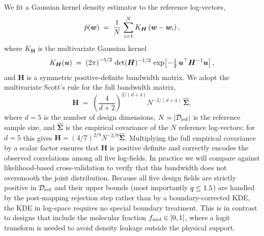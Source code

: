 We fit a Gaussian kernel density estimator to the reference log-vectors,
\begin{equation}
\hat{p}(\bm{w}) \;=\; \frac{1}{N}\,\sum_{i=1}^{N}
K_{\bm{H}}\left({\bm{w} - \bm{w}_i}\right),
\label{eq:kde}
\end{equation}
where $K_{\bm{H}}$ is the multivariate Gaussian kernel
\begin{equation}
K_{\bm{H}}(\bm{u}) \;=\;
\left({2\pi}\right)^{-5/2}\,\det(\bm{H})^{-1/2}\,
\exp\!\left[{-\tfrac{1}{2}\,\bm{u}^{\top}\bm{H}^{-1}\bm{u}}\right],
\label{eq:gaussian_kernel}
\end{equation}
and $\bm{H}$ is a symmetric positive-definite bandwidth matrix. We adopt
the multivariate Scott's rule for the full bandwidth matrix,
\begin{equation}
\bm{H} \;=\; \left(\frac{4}{d+2}\right)^{\!\!2/(d+4)}
\!\! N^{-2/(d+4)}\,\hat{\bm{\Sigma}},
\label{eq:scott_rule}
\end{equation}
where $d = 5$ is the number of design dimensions,
$N = |\mathcal{D}_{\rm ref}|$ is the reference sample size, and $\hat{\bm{\Sigma}}$ is
the empirical covariance of the $N$ reference log-vectors; for $d=5$
this gives $\bm{H} = (4/7)^{2/9} N^{-2/9} \hat{\bm{\Sigma}}$.
Multiplying the full empirical covariance by a scalar factor ensures
that $\bm{H}$ is positive definite and correctly encodes the observed
correlations among all five log-fields. In practice we will compare
against likelihood-based cross-validation to verify that this bandwidth
does not oversmooth the joint distribution.
Because all five design fields are strictly positive in $\mathcal{D}_{\rm ref}$ and
their upper bounds (most importantly $q \leq 1.5$) are handled
by the post-mapping rejection step rather than by a boundary-corrected
KDE, the KDE in log-space requires no special boundary treatment.
This is in contrast to designs that include the molecular fraction
$f_{\rm mol} \in [0,1]$, where a logit transform is needed to avoid
density leakage outside the physical support.

